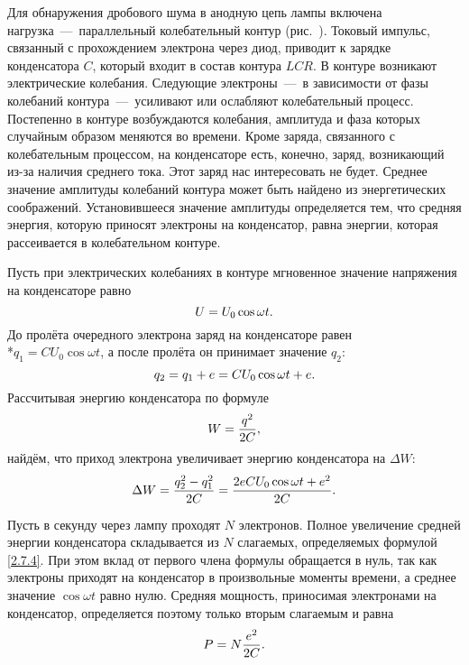 Для обнаружения дробового шума в анодную цепь лампы включена нагрузка~---~параллельный колебательный контур (рис.~).
Токовый импульс, связанный с прохождением электрона через диод, приводит к зарядке конденсатора $C$, который входит в
состав контура $LCR$. В контуре возникают электрические колебания. Следующие электроны~---~в зависимости от фазы
колебаний контура~---~усиливают или ослабляют колебательный процесс. Постепенно в контуре возбуждаются колебания,
амплитуда и фаза которых случайным образом меняются во времени. Кроме заряда, связанного с колебательным процессом, на
конденсаторе есть, конечно, заряд, возникающий из-за наличия среднего тока. Этот заряд нас интересовать не будет.
Среднее значение амплитуды колебаний контура может быть найдено из энергетических соображений. Установившееся значение
амплитуды определяется тем, что средняя энергия, которую приносят электроны на конденсатор, равна энергии, которая
рассеивается в колебательном контуре.

Пусть при электрических колебаниях в контуре мгновенное значение напряжения на конденсаторе равно
\begin{equation}
	\eqmark{2.7.1}
	U=U_0\cos\omega t.
\end{equation}
До пролёта очередного электрона заряд на конденсаторе равен\\*$q_1 = CU_0\cos\omega t$, а после пролёта он принимает значение
$q_2$:
\begin{equation}
	\eqmark{2.7.2}
	q_2=q_1+e=CU_0\cos\omega t+e.
\end{equation}
Рассчитывая энергию конденсатора по формуле
\begin{equation}
	\eqmark{2.7.3}
	W=\frac{q^2}{2C},
\end{equation}
найдём, что приход электрона увеличивает энергию конденсатора на $\Delta W$:
\begin{equation}
	\eqmark{2.7.4}
	\Delta W=\frac{q_2^2-q_1^2}{2C}=\frac{2eCU_0\cos\omega t+e^2}{2C}.
\end{equation}

Пусть в секунду через лампу проходят $N$ электронов. Полное увеличение средней энергии конденсатора складывается из $N$
слагаемых, определяемых формулой \eqref{2.7.4}. При этом вклад от первого члена формулы обращается в нуль, так как электроны
приходят на конденсатор в произвольные моменты времени, а среднее значение $\cos\omega t$ равно нулю. Средняя мощность,
приносимая электронами на конденсатор, определяется поэтому только вторым слагаемым и равна
\begin{equation}
	\eqmark{2.7.5}
	P=N\frac{e^2}{2C}.
\end{equation}

